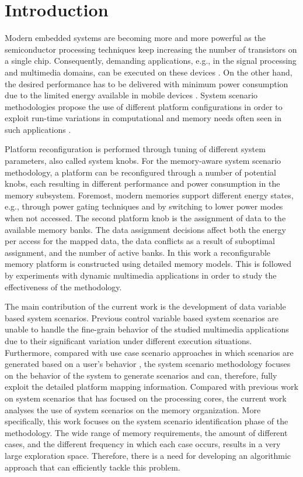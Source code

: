 \section{Introduction}
\label{sec:introductionC}

Modern embedded systems are becoming more and more powerful as the semiconductor processing techniques keep increasing the number of transistors on a single chip. 
Consequently, demanding applications, e.g., in the signal processing and multimedia domains, can be executed on these devices \cite{narasinga}. 
On the other hand, the desired performance has to be delivered with minimum power consumption due to the limited energy available in mobile devices \cite{tcm}. 
System scenario methodologies propose the use of different platform configurations in order to exploit run-time variations in computational and memory needs often seen in such applications \cite{tcm}.

Platform reconfiguration is performed through tuning of different system parameters, also called system knobs. 
For the memory-aware system scenario methodology, a platform can be reconfigured through a number of potential knobs, each resulting in different performance and power consumption in the memory subsystem. 
Foremost, modern memories support different energy states, e.g., through power gating techniques and by switching to lower power modes when not accessed. 
The second platform knob is the assignment of data to the available memory banks.
The data assignment decisions affect both the energy per access for the mapped data, the data conflicts as a result of suboptimal assignment, and the number of active banks. 
In this work a reconfigurable memory platform is constructed using detailed memory models. 
This is followed by experiments with dynamic multimedia applications in order to study the effectiveness of the methodology.

The main contribution of the current work is the development of data variable \cite{Elena2012} based system scenarios.
Previous control variable based system scenarios \cite{Gheorghita2007} are unable to handle the fine-grain behavior of the studied multimedia applications due to their significant variation under different execution situations. 
Furthermore, compared with use case scenario approaches in which scenarios are generated based on a user's behavior \cite{usecase}, the system scenario methodology focuses on the behavior of the system to generate scenarios and can, therefore, fully exploit the detailed platform mapping information. 
Compared with previous work on system scenarios that has focused on the processing cores, the current work analyses the use of system scenarios on the memory organization. 
More specifically, this work focuses on the system scenario identification phase of the methodology.
The wide range of memory requirements, the amount of different cases, and the different frequency in which each case occurs, results in a very large exploration space.
Therefore, there is a need for developing an algorithmic approach that can efficiently tackle this problem.

